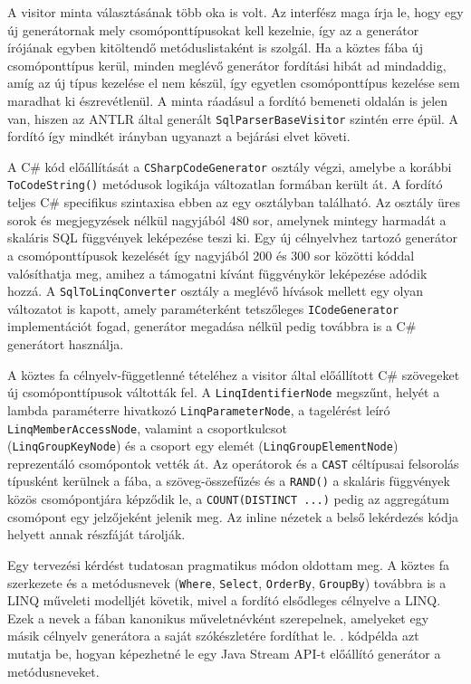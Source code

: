 A visitor minta választásának több oka is volt. Az interfész maga írja le, hogy egy új generátornak mely csomóponttípusokat kell kezelnie, így az a generátor írójának egyben kitöltendő metóduslistaként is szolgál. Ha a köztes fába új csomóponttípus kerül, minden meglévő generátor fordítási hibát ad mindaddig, amíg az új típus kezelése el nem készül, így egyetlen csomóponttípus kezelése sem maradhat ki észrevétlenül. A minta ráadásul a fordító bemeneti oldalán is jelen van, hiszen az ANTLR által generált \texttt{SqlParserBaseVisitor} szintén erre épül. A fordító így mindkét irányban ugyanazt a bejárási elvet követi.

A C\# kód előállítását a \texttt{CSharpCodeGenerator} osztály végzi, amelybe a korábbi \\ \texttt{ToCodeString()} metódusok logikája változatlan formában került át. A fordító teljes C\# specifikus szintaxisa ebben az egy osztályban található. Az osztály üres sorok és megjegyzések nélkül nagyjából 480 sor, amelynek mintegy harmadát a skaláris SQL függvények leképezése teszi ki. Egy új célnyelvhez tartozó generátor a csomóponttípusok kezelését így nagyjából 200 és 300 sor közötti kóddal valósíthatja meg, amihez a támogatni kívánt függvénykör leképezése adódik hozzá. A \texttt{SqlToLinqConverter} osztály a meglévő hívások mellett egy olyan változatot is kapott, amely paraméterként tetszőleges \texttt{ICodeGenerator} implementációt fogad, generátor megadása nélkül pedig továbbra is a C\# generátort használja.

A köztes fa célnyelv-függetlenné tételéhez a visitor által előállított C\# szövegeket új csomóponttípusok váltották fel. A \texttt{LinqIdentifierNode} megszűnt, helyét a lambda paraméterre hivatkozó \texttt{LinqParameterNode}, a tagelérést leíró \texttt{LinqMemberAccessNode}, valamint a csoportkulcsot \\(\texttt{LinqGroupKeyNode}) és a csoport egy elemét (\texttt{LinqGroupElementNode}) reprezentáló csomópontok vették át. Az operátorok és a \texttt{CAST} céltípusai felsorolás típusként kerülnek a fába, a szöveg-összefűzés és a \texttt{RAND()} a skaláris függvények közös csomópontjára képződik le, a \texttt{COUNT(DISTINCT ...)} pedig az aggregátum csomópont egy jelzőjeként jelenik meg. Az inline nézetek a belső lekérdezés kódja helyett annak részfáját tárolják.

Egy tervezési kérdést tudatosan pragmatikus módon oldottam meg. A köztes fa szerkezete és a metódusnevek (\texttt{Where}, \texttt{Select}, \texttt{OrderBy}, \texttt{GroupBy}) továbbra is a LINQ műveleti modelljét követik, mivel a fordító elsődleges célnyelve a LINQ. Ezek a nevek a fában kanonikus műveletnévként szerepelnek, amelyeket egy másik célnyelv generátora a saját szókészletére fordíthat le. . kódpélda azt mutatja be, hogyan képezhetné le egy Java Stream API-t előállító generátor a metódusneveket.

